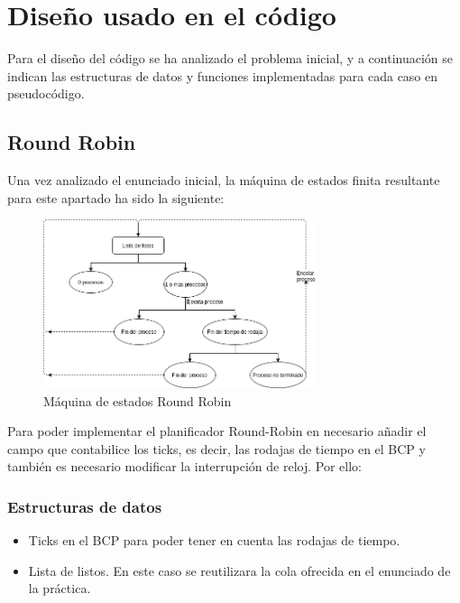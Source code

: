 \documentclass[10pt, spanish, pdftex]{template/UC3M_document}
\begin{document}
\newpage
\section{Diseño usado en el código}
Para el diseño del código se ha analizado el problema inicial, y a continuación se indican las estructuras de datos y funciones implementadas para cada caso en pseudocódigo.

\subsection{Round Robin}
Una vez analizado el enunciado inicial, la máquina de estados finita resultante para este apartado ha sido la siguiente:

\vspace{0.5cm}
\begin{figure}[h]
    \centering
    \includegraphics[width=8cm]{arboles/RoundRobin.png}
    \caption{Máquina de estados Round Robin}
\end{figure}

Para poder implementar el planificador Round-Robin en necesario añadir el campo que contabilice los ticks, es decir, las rodajas  de tiempo en el BCP y también es necesario modificar la interrupción de reloj. Por ello:

\subsubsection{Estructuras de datos}
\begin{itemize}
    \item Ticks en el BCP para poder tener en cuenta las rodajas de tiempo.
    \item Lista de listos. En este caso se reutilizara la cola ofrecida en el enunciado de la práctica.
\end{itemize}
\end{document}
